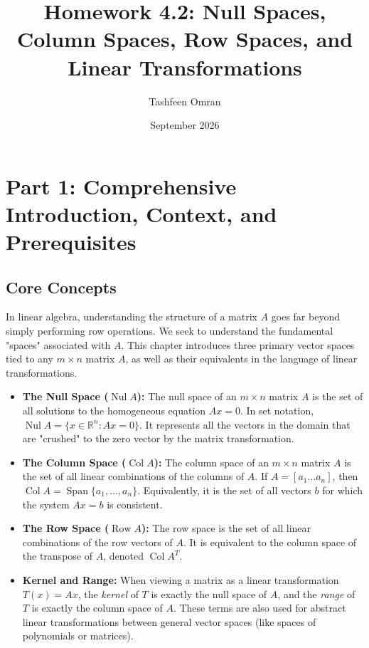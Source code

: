\documentclass[11pt]{article}
\title{Homework 4.2: Null Spaces, Column Spaces, Row Spaces, and Linear Transformations}
\author{Tashfeen Omran}
\date{September 2026}
\begin{document}
\maketitle
\tableofcontents
\newpage

\section{Part 1: Comprehensive Introduction, Context, and Prerequisites}

\subsection{Core Concepts}
In linear algebra, understanding the structure of a matrix $A$ goes far beyond simply performing row operations. We seek to understand the fundamental "spaces" associated with $A$. This chapter introduces three primary vector spaces tied to any $m \times n$ matrix $A$, as well as their equivalents in the language of linear transformations.

\begin{itemize}
    \item \textbf{The Null Space ($\operatorname{Nul} A$):} The null space of an $m \times n$ matrix $A$ is the set of all solutions to the homogeneous equation $Ax = 0$. In set notation, $\operatorname{Nul} A = \{x \in \mathbb{R}^n : Ax = 0\}$. It represents all the vectors in the domain that are "crushed" to the zero vector by the matrix transformation.
    \item \textbf{The Column Space ($\operatorname{Col} A$):} The column space of an $m \times n$ matrix $A$ is the set of all linear combinations of the columns of $A$. If $A = [a_1 \dots a_n]$, then $\operatorname{Col} A = \operatorname{Span}\{a_1, \dots, a_n\}$. Equivalently, it is the set of all vectors $b$ for which the system $Ax = b$ is consistent.
    \item \textbf{The Row Space ($\operatorname{Row} A$):} The row space is the set of all linear combinations of the row vectors of $A$. It is equivalent to the column space of the transpose of $A$, denoted $\operatorname{Col} A^T$.
    \item \textbf{Kernel and Range:} When viewing a matrix as a linear transformation $T(x) = Ax$, the \textit{kernel} of $T$ is exactly the null space of $A$, and the \textit{range} of $T$ is exactly the column space of $A$. These terms are also used for abstract linear transformations between general vector spaces (like spaces of polynomials or matrices).
\end{itemize}
\end{document}
